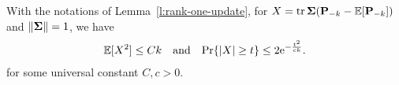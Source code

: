 \documentclass[thesis.tex]{subfiles}
\begin{document}

\begin{lemma}\label{l:trace}
With the notations of Lemma~\ref{l:rank-one-update}, for $X=\mathrm{tr}\,\mathbf{\Sigma}(\mathbf P_{-k}-\mathbb E[\mathbf P_{-k}])$
and $\|\mathbf{\Sigma}\| = 1$, we have
\begin{align*}
  \mathbb E[X^2]\leq
  Ck\quad\text{and}\quad\mathrm{Pr}\{|X|\geq t\}\leq 2 \mathrm{e}^{-\frac{t^2}{ck}}.
  \end{align*}
  for some universal constant $C,c > 0$.
\end{lemma}
\end{document}
